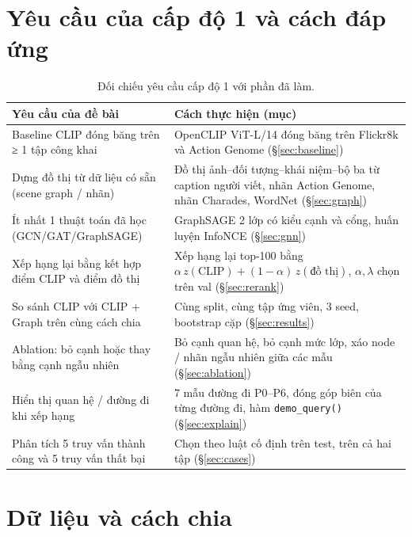 \documentclass[11pt,a4paper]{article}
\begin{document}
\tableofcontents
\bigskip

\section{Yêu cầu của cấp độ 1 và cách đáp ứng}

\begin{table}[H]
\centering\small
\begin{tabularx}{\linewidth}{>{\raggedright\arraybackslash}p{5.2cm}Y}
\toprule
\textbf{Yêu cầu của đề bài} & \textbf{Cách thực hiện (mục)} \\
\midrule
Baseline CLIP đóng băng trên ≥ 1 tập công khai & OpenCLIP ViT-L/14 đóng băng trên Flickr8k và Action Genome (§\ref{sec:baseline}) \\
Dựng đồ thị từ dữ liệu có sẵn (scene graph / nhãn) & Đồ thị ảnh–đối tượng–khái niệm–bộ ba từ caption người viết, nhãn Action Genome, nhãn Charades, WordNet (§\ref{sec:graph}) \\
Ít nhất 1 thuật toán đã học (GCN/GAT/GraphSAGE) & GraphSAGE 2 lớp có kiểu cạnh và cổng, huấn luyện InfoNCE (§\ref{sec:gnn}) \\
Xếp hạng lại bằng kết hợp điểm CLIP và điểm đồ thị & Xếp hạng lại top-100 bằng \(\alpha\,z(\text{CLIP})+(1-\alpha)\,z(\text{đồ thị})\), \(\alpha,\lambda\) chọn trên val (§\ref{sec:rerank}) \\
So sánh CLIP với CLIP + Graph trên cùng cách chia & Cùng split, cùng tập ứng viên, 3 seed, bootstrap cặp (§\ref{sec:results}) \\
Ablation: bỏ cạnh hoặc thay bằng cạnh ngẫu nhiên & Bỏ cạnh quan hệ, bỏ cạnh mức lớp, xáo node / nhãn ngẫu nhiên giữa các mẫu (§\ref{sec:ablation}) \\
Hiển thị quan hệ / đường đi khi xếp hạng & 7 mẫu đường đi P0–P6, đóng góp biên của từng đường đi, hàm \texttt{demo\_query()} (§\ref{sec:explain}) \\
Phân tích 5 truy vấn thành công và 5 truy vấn thất bại & Chọn theo luật cố định trên test, trên cả hai tập (§\ref{sec:cases}) \\
\bottomrule
\end{tabularx}
\caption{Đối chiếu yêu cầu cấp độ 1 với phần đã làm.}
\end{table}

\section{Dữ liệu và cách chia}\label{sec:data}
\end{document}
